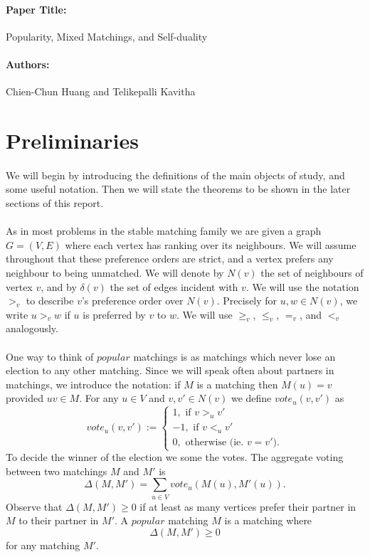 \documentclass[letterpaper,12pt,oneside,onecolumn]{article}
\begin{document}
\paragraph{Paper Title:} Popularity, Mixed Matchings, and Self-duality
\paragraph{Authors:} Chien-Chun Huang and Telikepalli Kavitha

\section{Preliminaries}
\paragraph{}
We will begin by introducing the definitions of the main objects of study, and some useful notation. Then we will state the theorems to be shown in the later sections of this report.
\paragraph{}
As in most problems in the stable matching family we are given a graph $G=(V,E)$ where each vertex has ranking over its neighbours. We will assume throughout that these preference orders are strict, and a vertex prefers any neighbour to being unmatched. We will denote by $N(v)$ the set of neighbours of vertex $v$, and by $\delta(v)$ the set of edges incident with $v$. We will use the notation $>_v$ to describe $v$'s preference order over $N(v)$. Precisely for $u, w \in N(v)$, we write $u >_v w$ if $u$ is preferred by $v$ to $w$. We will use $\geq_v$, $\leq_v$, $=_v$, and $<_v$ analogously.
\paragraph{}
One way to think of $\textit{popular}$ matchings is as matchings which never lose an election to any other matching. Since we will speak often about partners in matchings, we introduce the notation: if $M$ is a matching then $M(u) = v$ provided $uv \in M$. For any $u \in V$ and $v,v' \in N(v)$ we define $vote_u(v,v')$ as
$$vote_u(v,v') := \begin{cases}
1, \text{ if } v >_u v' \\
-1, \text{ if } v <_u v' \\
0, \text{ otherwise (ie. } v = v').
\end{cases}$$
To decide the winner of the election we some the votes. The aggregate voting between two matchings $M$ and $M'$ is
$$\Delta(M, M') = \sum_{u \in V} vote_u(M(u), M'(u)).$$
Observe that $\Delta(M,M') \geq 0$ if at least as many vertices prefer their partner in $M$ to their partner in $M'$. A $\textit{popular}$ matching $M$ is  a matching where
$$\Delta(M, M') \geq 0$$
for any matching $M'$.
\end{document}
